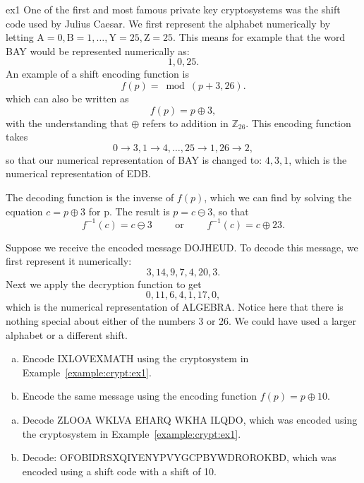 \begin{example}{ex1}
One of the first and most famous private key cryptosystems was the
shift code used by Julius Caesar.  We first represent the alphabet numerically by
letting $\mbox{A}  = 0, \mbox{B}  = 1, \ldots, \mbox{Y} = 25, \mbox{Z} = 25$. This means for example that the word BAY would be represented numerically as:
$$ 1,0,25.$$
An example of a shift encoding function is
$$
f(p) =\bmod( p + 3,  26).
$$
which can also be written as
$$
f(p) =p \oplus 3,
$$
with the understanding that $\oplus$ refers to addition in $\mathbb{Z}_{26}$. This encoding function takes 
$$0 \rightarrow 3, 1 \rightarrow 4, \ldots, 25 \rightarrow 1,26 \rightarrow 2,$$
so that our numerical representation of BAY is changed to:  $ 4,3,1$, which is the numerical representation of EDB.

The decoding
function is the inverse of $f(p)$, which we can find by solving the equation $c = p \oplus 3$ for p.
The result is $p = c \ominus 3$, so that
$$
f^{-1}(c) = c \ominus 3 \qquad \textrm{ or }\qquad f^{-1}(c) = c \oplus 23.
$$

Suppose we receive the encoded message DOJHEUD. To decode this
message, we first represent it numerically:  
$$
3, 14, 9, 7, 4, 20, 3.
$$
Next we apply the decryption function to get
$$
0, 11, 6, 4, 1, 17, 0,
$$
which is the numerical representation of ALGEBRA. Notice here that there is nothing special about either of
the numbers 3 or 26. We could have used a larger alphabet or a
different shift.
\mbox{\hspace{1in}}
\end{example}

\begin{exercise}{}
\begin{enumerate}[(a)]
\item
Encode IXLOVEXMATH using the cryptosystem in Example~\ref{example:crypt:ex1}.
\item
Encode the same message using the encoding function $f(p) =p \oplus 10$.
\end{enumerate}
\end{exercise} 
 \medskip

\begin{exercise}{}
\begin{enumerate}[(a)]
\item
Decode ZLOOA WKLVA EHARQ WKHA ILQDO, which was encoded using the
cryptosystem in Example~\ref{example:crypt:ex1}.
\item
Decode: OFOBIDRSXQIYENYPVYGCPBYWDROROKBD, which was encoded using a shift code with a shift of 10.
\end{enumerate}
\end{exercise} 

